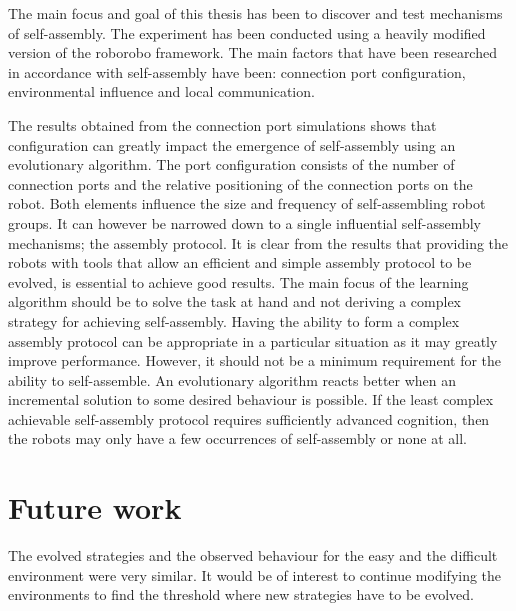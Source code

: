 The main focus and goal of this thesis has been to discover and test mechanisms of self-assembly.
The experiment has been conducted using a heavily modified version of the roborobo framework.
The main factors that have been researched in accordance with self-assembly have been: connection port configuration, environmental influence and local communication.

The results obtained from the connection port simulations shows that configuration can greatly impact the emergence of self-assembly using an evolutionary algorithm.
The port configuration consists of the number of connection ports and the relative positioning of the connection ports on the robot.
Both elements influence the size and frequency of self-assembling robot groups.
It can however be narrowed down to a single influential self-assembly mechanisms; the assembly protocol.
It is clear from the results that providing the robots with tools that allow an efficient and simple assembly protocol to be evolved, is essential to achieve good results.
The main focus of the learning algorithm should be to solve the task at hand and not deriving a complex strategy for achieving self-assembly.
Having the ability to form a complex assembly protocol can be appropriate in a particular situation as it may greatly improve performance.
However, it should not be a minimum requirement for the ability to self-assemble.
An evolutionary algorithm reacts better when an incremental solution to some desired behaviour is possible.
If the least complex achievable self-assembly protocol requires sufficiently advanced cognition, then the robots may only have a few occurrences of self-assembly or none at all.




\section{Future work}
The evolved strategies and the observed behaviour for the easy and the difficult environment were very similar.
It would be of interest to continue modifying the environments to find the threshold where new strategies have to be evolved. 